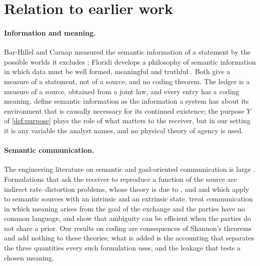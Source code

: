 \section{Relation to earlier work}\label{sec:related}
\paragraph{Information and meaning.} Bar-Hillel and Carnap measured the semantic information of a statement by the possible worlds it excludes \citep{barhillel1953}; Floridi develops a philosophy of semantic information in which data must be well formed, meaningful and truthful \citep{floridi2011}. Both give a measure of a statement, not of a source, and no coding theorem. The ledger is a measure of a source, obtained from a joint law, and every entry has a coding meaning. \citet{kolchinsky2018} define semantic information as the information a system has about its environment that is causally necessary for its continued existence; the purpose $Y$ of \cref{def:purpose} plays the role of what matters to the receiver, but in our setting it is any variable the analyst names, and no physical theory of agency is used.

\paragraph{Semantic communication.} The engineering literature on semantic and goal-oriented communication is large \citep{bao2011,gunduz2023}. Formulations that ask the receiver to reproduce a function of the source are indirect rate--distortion problems, whose theory is due to \citet{dobrushin1962}, \citet{wolf1970} and \citet{witsenhausen1980} and which \citet{liu2021} apply to semantic sources with an intrinsic and an extrinsic state. \citet{goldreich2012} treat communication in which meaning arises from the goal of the exchange and the parties have no common language, and \citet{juba2011} show that ambiguity can be efficient when the parties do not share a prior. Our results on coding are consequences of Shannon's theorems and add nothing to these theories; what is added is the accounting that separates the three quantities every such formulation uses, and the leakage that tests a chosen meaning.

